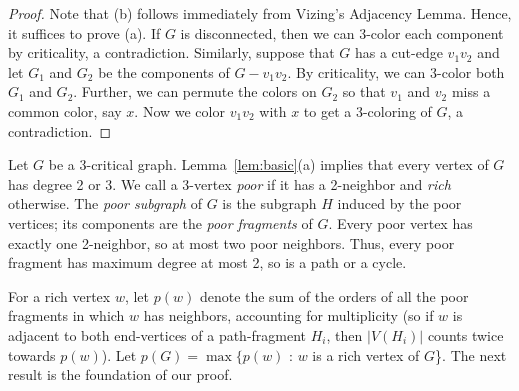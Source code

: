 \documentclass[12pt]{article}
\theoremstyle{plain}
\theoremstyle{definition}
\theoremstyle{remark}
\begin{document}
\begin{proof}
Note that (b) follows immediately from Vizing's Adjacency Lemma.
Hence, it suffices to prove (a).  If $G$ is disconnected, then we can
3-color each component by criticality, a
contradiction.  Similarly, suppose that $G$ has a cut-edge $v_1v_2$ and let
$G_1$ and $G_2$ be the components of $G-v_1v_2$.  By criticality, we can 3-color
both $G_1$ and $G_2$.  Further, we can permute the colors on $G_2$ so that $v_1$
and $v_2$ miss a common color, say $x$.  Now we color $v_1v_2$ with $x$ to get a
3-coloring of $G$, a contradiction.
%
%
\end{proof}
\smallskip

Let $G$ be a 3-critical graph.  Lemma~\ref{lem:basic}(a) implies that every vertex of
$G$ has degree 2 or 3.  We call a 3-vertex \emph{poor} if it has a 2-neighbor
and \emph{rich} otherwise.  The \emph{poor subgraph} of $G$ is the subgraph $H$
induced by the poor vertices; its components are the \emph{poor fragments} of
$G$.  Every poor vertex has exactly one 2-neighbor, so at most two poor
neighbors.  Thus, every poor fragment has maximum degree at most 2, so is a
path or a cycle.

For a rich vertex $w$, let $p(w)$ denote the sum of the orders of all the poor
fragments in which $w$ has neighbors, accounting for multiplicity (so if $w$ is
adjacent to both end-vertices of a path-fragment $H_i$, then $|V(H_i)|$ counts
twice towards $p(w)$).  Let $p(G)=\max\{p(w)$ : $w$ is a rich vertex of $G$\}. 
The next result is the foundation of our proof.
\end{document}
